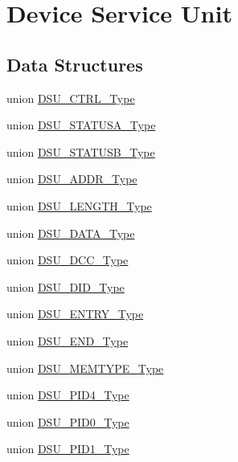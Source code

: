 \hypertarget{group___s_a_m_d21___d_s_u}{}\section{Device Service Unit}
\label{group___s_a_m_d21___d_s_u}
\subsection*{Data Structures}
\begin{DoxyCompactItemize}
\item 
union \mbox{\hyperlink{union_d_s_u___c_t_r_l___type}{D\+S\+U\+\_\+\+C\+T\+R\+L\+\_\+\+Type}}
\item 
union \mbox{\hyperlink{union_d_s_u___s_t_a_t_u_s_a___type}{D\+S\+U\+\_\+\+S\+T\+A\+T\+U\+S\+A\+\_\+\+Type}}
\item 
union \mbox{\hyperlink{union_d_s_u___s_t_a_t_u_s_b___type}{D\+S\+U\+\_\+\+S\+T\+A\+T\+U\+S\+B\+\_\+\+Type}}
\item 
union \mbox{\hyperlink{union_d_s_u___a_d_d_r___type}{D\+S\+U\+\_\+\+A\+D\+D\+R\+\_\+\+Type}}
\item 
union \mbox{\hyperlink{union_d_s_u___l_e_n_g_t_h___type}{D\+S\+U\+\_\+\+L\+E\+N\+G\+T\+H\+\_\+\+Type}}
\item 
union \mbox{\hyperlink{union_d_s_u___d_a_t_a___type}{D\+S\+U\+\_\+\+D\+A\+T\+A\+\_\+\+Type}}
\item 
union \mbox{\hyperlink{union_d_s_u___d_c_c___type}{D\+S\+U\+\_\+\+D\+C\+C\+\_\+\+Type}}
\item 
union \mbox{\hyperlink{union_d_s_u___d_i_d___type}{D\+S\+U\+\_\+\+D\+I\+D\+\_\+\+Type}}
\item 
union \mbox{\hyperlink{union_d_s_u___e_n_t_r_y___type}{D\+S\+U\+\_\+\+E\+N\+T\+R\+Y\+\_\+\+Type}}
\item 
union \mbox{\hyperlink{union_d_s_u___e_n_d___type}{D\+S\+U\+\_\+\+E\+N\+D\+\_\+\+Type}}
\item 
union \mbox{\hyperlink{union_d_s_u___m_e_m_t_y_p_e___type}{D\+S\+U\+\_\+\+M\+E\+M\+T\+Y\+P\+E\+\_\+\+Type}}
\item 
union \mbox{\hyperlink{union_d_s_u___p_i_d4___type}{D\+S\+U\+\_\+\+P\+I\+D4\+\_\+\+Type}}
\item 
union \mbox{\hyperlink{union_d_s_u___p_i_d0___type}{D\+S\+U\+\_\+\+P\+I\+D0\+\_\+\+Type}}
\item 
union \mbox{\hyperlink{union_d_s_u___p_i_d1___type}{D\+S\+U\+\_\+\+P\+I\+D1\+\_\+\+Type}}
\item 

\end{DoxyCompactItemize}
